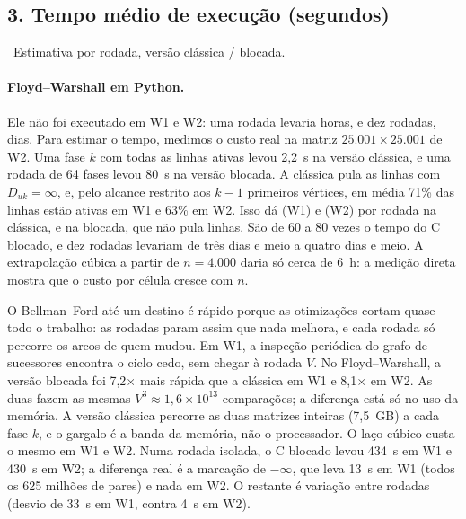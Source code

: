 \documentclass[a4paper,11pt]{article}
\begin{document}
\subsection*{3. Tempo médio de execução (segundos)}

\begin{center}
\TabelaTempos
\par\smallskip
\footnotesize\dag~Estimativa por rodada, versão clássica / blocada.
\end{center}

\paragraph{Floyd--Warshall em Python.} Ele não foi executado em W1 e W2: uma rodada levaria horas, e dez rodadas, dias. Para estimar o tempo, medimos o custo real na matriz \(25.001\times25.001\) de W2. Uma fase \(k\) com todas as linhas ativas levou 2,2~s na versão clássica, e uma rodada de 64 fases levou 80~s na versão blocada. A clássica pula as linhas com \(D_{uk}=\infty\), e, pelo alcance restrito aos \(k-1\) primeiros vértices, em média 71\% das linhas estão ativas em W1 e 63\% em W2. Isso dá \EstimativaPyClassicoUm{} (W1) e \EstimativaPyClassicoDois{} (W2) por rodada na clássica, e \EstimativaPyBlocado{} na blocada, que não pula linhas. São de 60 a 80 vezes o tempo do C blocado, e dez rodadas levariam de três dias e meio a quatro dias e meio. A extrapolação cúbica a partir de \(n=4.000\) daria só cerca de 6~h: a medição direta mostra que o custo por célula cresce com \(n\).

O Bellman--Ford até um destino é rápido porque as otimizações cortam quase todo o trabalho: as rodadas param assim que nada melhora, e cada rodada só percorre os arcos de quem mudou. Em W1, a inspeção periódica do grafo de sucessores encontra o ciclo cedo, sem chegar à rodada \(V\). No Floyd--Warshall, a versão blocada foi 7,2\(\times\) mais rápida que a clássica em W1 e 8,1\(\times\) em W2. As duas fazem as mesmas \(V^3\approx1{,}6\times10^{13}\) comparações; a diferença está só no uso da memória. A versão clássica percorre as duas matrizes inteiras (7,5~GB) a cada fase \(k\), e o gargalo é a banda da memória, não o processador. O laço cúbico custa o mesmo em W1 e W2. Numa rodada isolada, o C blocado levou 434~s em W1 e 430~s em W2; a diferença real é a marcação de \(-\infty\), que leva 13~s em W1 (todos os 625 milhões de pares) e nada em W2. O restante é variação entre rodadas (desvio de 33~s em W1, contra 4~s em W2).
\end{document}
